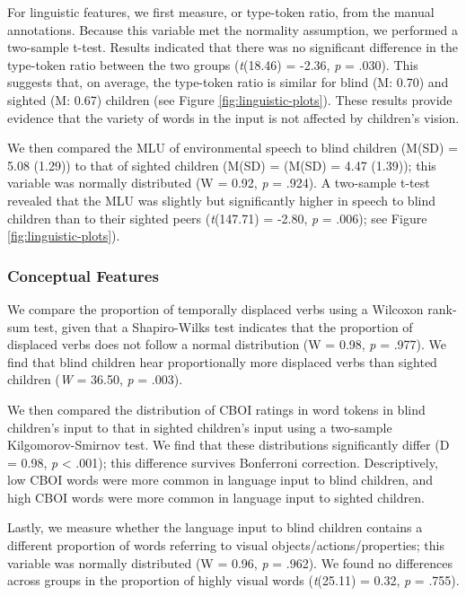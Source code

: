 \documentclass[
  man,floatsintext]{apa6}
\begin{document}
For linguistic features, we first measure, or type-token ratio, from the manual annotations. Because this variable met the normality assumption, we performed a two-sample t-test. Results indicated that there was no significant difference in the type-token ratio between the two groups (\emph{t}(18.46) = -2.36, \emph{p} = .030). This suggests that, on average, the type-token ratio is similar for blind (M: 0.70) and sighted (M: 0.67) children (see Figure \ref{fig:linguistic-plots}). These results provide evidence that the variety of words in the input is not affected by children's vision.

We then compared the MLU of environmental speech to blind children (M(SD) = 5.08 (1.29)) to that of sighted children (M(SD) = (M(SD) = 4.47 (1.39)); this variable was normally distributed (W = 0.92, \emph{p} = .924). A two-sample t-test revealed that the MLU was slightly but significantly higher in speech to blind children than to their sighted peers (\emph{t}(147.71) = -2.80, \emph{p} = .006); see Figure \ref{fig:linguistic-plots}).

\hypertarget{conceptual-features-1}{%
\subsubsection{Conceptual Features}\label{conceptual-features-1}}

We compare the proportion of temporally displaced verbs using a Wilcoxon rank-sum test, given that a Shapiro-Wilks test indicates that the proportion of displaced verbs does not follow a normal distribution (W = 0.98, \emph{p} = .977). We find that blind children hear proportionally more displaced verbs than sighted children (\emph{W} = 36.50, \emph{p} = .003).

We then compared the distribution of CBOI ratings in word tokens in blind children's input to that in sighted children's input using a two-sample Kilgomorov-Smirnov test. We find that these distributions significantly differ (D = 0.98, \emph{p} \textless{} .001); this difference survives Bonferroni correction. Descriptively, low CBOI words were more common in language input to blind children, and high CBOI words were more common in language input to sighted children.

Lastly, we measure whether the language input to blind children contains a different proportion of words referring to visual objects/actions/properties; this variable was normally distributed (W = 0.96, \emph{p} = .962). We found no differences across groups in the proportion of highly visual words (\emph{t}(25.11) = 0.32, \emph{p} = .755).
\end{document}
